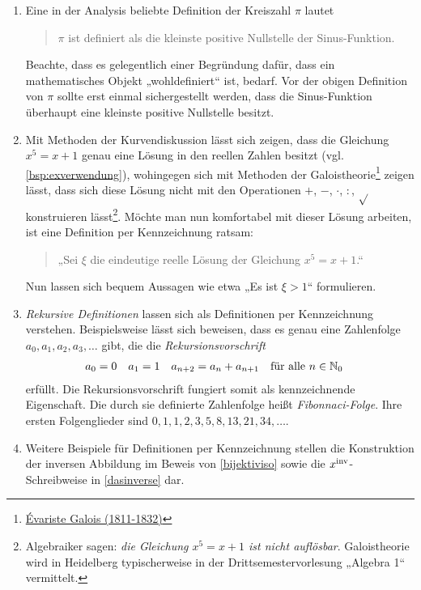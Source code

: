 \begin{bsp} \label{zeichendefinieren} \quad
    \begin{enumerate}
        \item Eine in der Analysis beliebte Definition der Kreiszahl $\pi$ lautet
        \begin{quote}
            $\pi$ ist definiert als die kleinste positive Nullstelle der Sinus-Funktion.
        \end{quote}
        Beachte, dass es gelegentlich einer Begründung dafür, dass ein mathematisches Objekt „wohldefiniert“ ist, bedarf. Vor der obigen Definition von $\pi$ sollte erst einmal sichergestellt werden, dass die Sinus-Funktion überhaupt eine kleinste positive Nullstelle besitzt.
        \item Mit Methoden der Kurvendiskussion lässt sich zeigen, dass die Gleichung $x^5=x+1$ genau eine Lösung in den reellen Zahlen besitzt (vgl. \cref{bsp:exverwendung}), wohingegen sich mit Methoden der Galoistheorie\footnote{\href{https://de.wikipedia.org/wiki/\%C3\%89variste_Galois}{Évariste Galois (1811-1832)}} zeigen lässt, dass sich diese Lösung nicht mit den Operationen $+$, $-$, $\cdot$, $:$, $\sqrt{}$ konstruieren lässt\footnote{Algebraiker sagen: \emph{die Gleichung $x^5=x+1$ ist nicht auflösbar}. Galoistheorie wird in Heidelberg typischerweise in der Drittsemestervorlesung „Algebra 1“ vermittelt.}. Möchte man nun komfortabel mit dieser Lösung arbeiten, ist eine Definition per Kennzeichnung ratsam:
        \begin{quote}
            „Sei $\xi$ die eindeutige reelle Lösung der Gleichung $x^5=x+1$.“
        \end{quote}
        Nun lassen sich bequem Aussagen wie etwa „Es ist $\xi>1$“ formulieren.
        \item \emph{Rekursive Definitionen} lassen sich als Definitionen per Kennzeichnung verstehen. Beispielsweise lässt sich beweisen, dass es genau eine Zahlenfolge $a_0,a_1,a_2,a_3,\dots$ gibt, die die \emph{Rekursionsvorschrift}
        \begin{align*}
            a_0 & = 0 & a_1 & = 1 & a_{n+2} & = a_n+a_{n+1}  && \text{für alle}\ n\in \mathbb N_0
        \end{align*}
        erfüllt. Die Rekursionsvorschrift fungiert somit als kennzeichnende Eigenschaft. Die durch sie definierte Zahlenfolge heißt \emph{Fibonnaci-Folge}. Ihre ersten Folgenglieder sind $0,1,1,2,3,5,8,13,21,34,\dots$.
        \item Weitere Beispiele für Definitionen per Kennzeichnung stellen die Konstruktion der inversen Abbildung im Beweis von \cref{bijektiviso} sowie die $x^{\mathrm{inv}}$-Schreibweise in \cref{dasinverse} dar.
    \end{enumerate}
\end{bsp}


